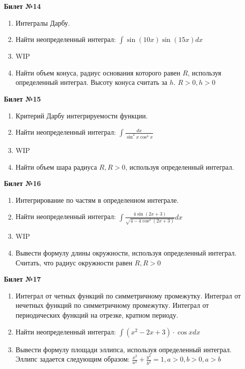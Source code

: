 \documentclass[a4paper, 12pt]{article}
\begin{document}
\begin{center}
	\textbf{Билет №14}
\end{center}
\begin{enumerate}
	\item Интегралы Дарбу.
	\item Найти неопределенный интеграл: $\displaystyle \int{\sin(10x) \sin(15x) dx}$
	\item WIP
	\item Найти объем конуса, радиус основания которого равен $R$, используя определенный интеграл. Высоту конуса считать за $h$. $\displaystyle R > 0, h> 0$
\end{enumerate}

\begin{center}
	\textbf{Билет №15}
\end{center}
\begin{enumerate}
	\item Критерий Дарбу интегрируемости функции.
	\item Найти неопределенный интеграл: $\displaystyle \int{\frac{dx}{\sin^2 x \cos^4 x}}$
	\item WIP
	\item Найти объем шара радиуса $R, R > 0$, используя определенный интеграл.
\end{enumerate}

\begin{center}
	\textbf{Билет №16}
\end{center}
\begin{enumerate}
	\item Интегрирование по частям в определенном интеграле.
	\item Найти неопределенный интеграл: $\displaystyle \int{\frac{4 \sin(2x+3)}{\sqrt{4 - 4\cos^2(2x+3)}}dx}$
	\item WIP
	\item Вывести формулу длины окружности, используя определенный интеграл. Считать, что радиус окружности равен $R, R>0$ 
\end{enumerate}

\begin{center}
	\textbf{Билет №17}
\end{center}
\begin{enumerate}
	\item Интеграл от четных функций по симметричному промежутку.
	Интеграл от нечетных функций по симметричному промежутку.
	Интеграл от периодических функций на отрезке, кратном периоду.
	\item Найти неопределенный интеграл: $\displaystyle \int{(x^2 - 2x + 3) \cdot \cos x dx}$
	\item Вывести формулу площади эллипса, используя определенный интеграл. Эллипс задается следующим образом: $\displaystyle \frac{x^2}{a^2} + \frac{y^2}{b^2} = 1, a > 0, b > 0, a > b$
\end{enumerate}
\end{document}
